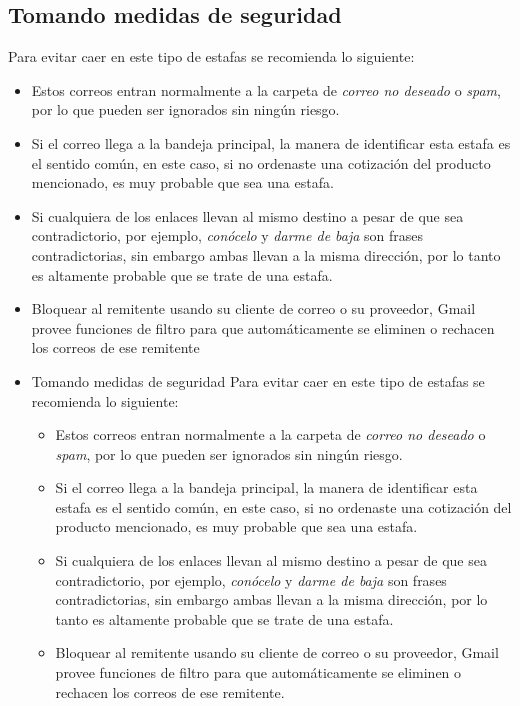 \documentclass[11pt]{article}
\begin{document}
\subsection{Tomando medidas de seguridad}
\label{sec:org5f81627}
Para evitar caer en este tipo de estafas se recomienda lo siguiente:
\begin{itemize}
\item Estos correos entran normalmente a la carpeta de \emph{correo no deseado} o \emph{spam}, por lo que pueden ser ignorados sin ningún riesgo.
\item Si el correo llega a la bandeja principal, la manera de identificar esta estafa es el sentido común, en este caso, si no ordenaste una cotización del producto mencionado, es muy probable que sea una estafa.
\item Si cualquiera de los enlaces llevan al mismo destino a pesar de que sea contradictorio, por ejemplo, \emph{conócelo} y \emph{darme de baja} son frases contradictorias, sin embargo ambas llevan a la misma dirección, por lo tanto es altamente probable que se trate de una estafa.
\item Bloquear al remitente usando su cliente de correo o su proveedor, Gmail provee funciones de filtro para que automáticamente se eliminen o rechacen los correos de ese remitente
\item Tomando medidas de seguridad
Para evitar caer en este tipo de estafas se recomienda lo siguiente:
\begin{itemize}
\item Estos correos entran normalmente a la carpeta de \emph{correo no deseado} o \emph{spam}, por lo que pueden ser ignorados sin ningún riesgo.
\item Si el correo llega a la bandeja principal, la manera de identificar esta estafa es el sentido común, en este caso, si no ordenaste una cotización del producto mencionado, es muy probable que sea una estafa.
\item Si cualquiera de los enlaces llevan al mismo destino a pesar de que sea contradictorio, por ejemplo, \emph{conócelo} y \emph{darme de baja} son frases contradictorias, sin embargo ambas llevan a la misma dirección, por lo tanto es altamente probable que se trate de una estafa.
\item Bloquear al remitente usando su cliente de correo o su proveedor, Gmail provee funciones de filtro para que automáticamente se eliminen o rechacen los correos de ese remitente.
\end{itemize}
\end{itemize}
\end{document}
